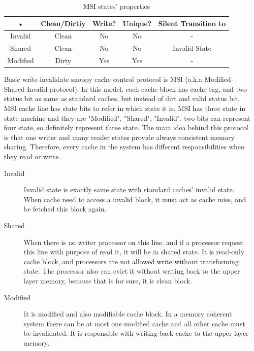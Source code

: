         \begin{table}[position specifier]
            \centering
            \begin{tabular}{|c|c|c|c|c|}
                \hline 
                • & Clean/Dirtiy & Write? & Unique? & Silent Transition to \\ 
                \hline 
                Invalid & Clean & No & No & - \\ 
                \hline 
                Shared & Clean & No & No & Invalid State \\ 
                \hline 
                Modified & Dirty & Yes & Yes & - \\ 
                \hline 
            \end{tabular} 
            \caption{MSI states' properties}
            \label{tab:MSItable}
        \end{table}


        Basic write-invalidate snoopy cache control protocol is MSI (a.k.a Modified-Shared-Invalid protocol). In this model, each cache block has cache tag, and two status bit as same as standard caches, but instead of dirt and valid status bit, MSI cache line has state bits to refer in which state it is. MSI has three state in state machine and they are "Modified", "Shared", "Invalid". two bits can represent four state, so definitely represent three state. The main idea behind this protocol is that one writer and many reader states provide always consistent memory sharing. Therefore, every cache in the system has different responsibilities when they read or write.

        \begin{description}
            \item[Invalid] Invalid state is exactly same state with standard caches' invalid state. When cache need to access a invalid block, it must act as cache miss, and  be fetched this block again.
            \item[Shared] When there is no writer processor on this line, and if  a processor request this line with purpose of read it, it will be in shared state.  It is read-only cache block, and processors are not allowed write without transforming state. The processor also can evict it without writing back to the upper layer memory, because that is for sure, it is clean block.
            \item[Modified] It is modified and also modifiable cache block. In a memory coherent system there can be at most one modified cache and all other cache must be invalidated. It is responsible with writing back cache to the upper layer memory. 
        \end{description}


